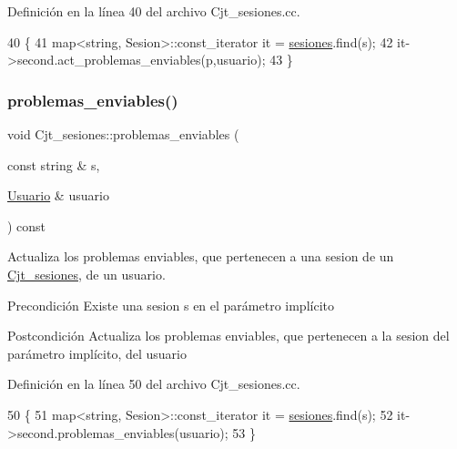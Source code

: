 Definición en la línea 40 del archivo Cjt\+\_\+sesiones.\+cc.


\begin{DoxyCode}
40                                                                                                        \{
41       map<string, Sesion>::const\_iterator it = \mbox{\hyperlink{class_cjt__sesiones_a87e835a62e561eeb0f93eedbdcbe1802}{sesiones}}.find(s);
42       it->second.act\_problemas\_enviables(p,usuario);
43     \}
\end{DoxyCode}
\mbox{\label{class_cjt__sesiones_a52b36f12479444065510c1acfb235dfe}} 
\subsubsection{\texorpdfstring{problemas\+\_\+enviables()}{problemas\_enviables()}}
{\footnotesize\ttfamily void Cjt\+\_\+sesiones\+::problemas\+\_\+enviables (\begin{DoxyParamCaption}\item[{const string \&}]{s,  }\item[{\mbox{\hyperlink{class_usuario}{Usuario}} \&}]{usuario }\end{DoxyParamCaption}) const}



Actualiza los problemas enviables, que pertenecen a una sesion de un \mbox{\hyperlink{class_cjt__sesiones}{Cjt\+\_\+sesiones}}, de un usuario. 

\begin{DoxyPrecond}{Precondición}
Existe una sesion s en el parámetro implícito 
\end{DoxyPrecond}
\begin{DoxyPostcond}{Postcondición}
Actualiza los problemas enviables, que pertenecen a la sesion del parámetro implícito, del usuario 
\end{DoxyPostcond}


Definición en la línea 50 del archivo Cjt\+\_\+sesiones.\+cc.


\begin{DoxyCode}
50                                                                                   \{
51       map<string, Sesion>::const\_iterator it = \mbox{\hyperlink{class_cjt__sesiones_a87e835a62e561eeb0f93eedbdcbe1802}{sesiones}}.find(s);
52       it->second.problemas\_enviables(usuario);
53     \}
\end{DoxyCode}
\mbox{\label{class_cjt__sesiones_a5dbd8b1687f2713d2b29af8781f1d013}} 
